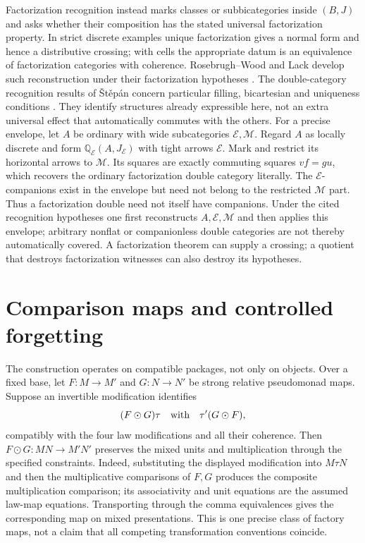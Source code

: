 \documentclass[11pt]{article}
\theoremstyle{definition}
\newcommand{\Qrel}{\mathbb Q}
\begin{document}
Factorization recognition instead marks classes or subbicategories inside
$(B,J)$ and asks whether their composition has the stated universal
factorization property. In strict discrete examples unique factorization
gives a normal form and hence a distributive crossing; with cells the
appropriate datum is an equivalence of factorization categories with
coherence. Rosebrugh--Wood and Lack develop such reconstruction under their
factorization hypotheses \cite{RosebrughWood,LackProps}. The double-category
recognition results of \v{S}t\v{e}p\'an concern particular filling,
bicartesian and uniqueness conditions
\cite[Theorems 3.3.7 and 3.3.33]{Stepan}. They identify structures already
expressible here, not an extra universal effect that automatically commutes
with the others. For a precise envelope, let $A$ be ordinary with wide subcategories
$\mathcal E,\mathcal M$. Regard $A$ as locally discrete and form
$\Qrel_{\mathcal E}(A,J_{\mathcal E})$ with tight arrows $\mathcal E$.
Mark and restrict its horizontal arrows to $\mathcal M$. Its squares are
exactly commuting squares $vf=gu$, which recovers the ordinary
factorization double category literally. The $\mathcal E$-companions exist
in the envelope but need not belong to the restricted $\mathcal M$ part.
Thus a factorization double need not itself have companions. Under the
cited recognition hypotheses one first reconstructs $A,\mathcal E,\mathcal M$
and then applies this envelope; arbitrary nonflat or companionless double
categories are not thereby automatically covered. A factorization theorem
can supply a crossing; a quotient that destroys factorization witnesses can
also destroy its hypotheses.

\section{Comparison maps and controlled forgetting}\label{sec:comparisons}

The construction operates on compatible packages, not only on objects.
Over a fixed base, let $F:M\to M'$ and $G:N\to N'$ be strong relative
pseudomonad maps. Suppose an invertible modification identifies
\[
 (F\odot G)\tau\quad\hbox{with}\quad\tau'(G\odot F),
\]
compatibly with the four law modifications and all their coherence.
Then $F\odot G:MN\to M'N'$ preserves the mixed units and multiplication
through the specified constraints. Indeed, substituting the displayed
modification into $M\tau N$ and then the multiplicative comparisons of
$F,G$ produces the composite multiplication comparison; its associativity
and unit equations are the assumed law-map equations. Transporting through
the comma equivalences gives the corresponding map on mixed presentations.
This is one precise class of factory maps, not a claim that all competing
transformation conventions coincide.
\end{document}
